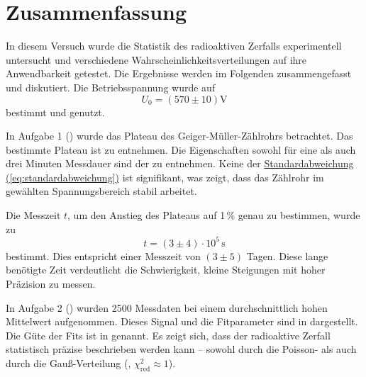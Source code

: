 



\section{Zusammenfassung}
\label{sec:Zusammenfassung}

In diesem Versuch wurde die Statistik des radioaktiven Zerfalls experimentell untersucht und verschiedene Wahrscheinlichkeitsverteilungen auf ihre Anwendbarkeit getestet. Die Ergebnisse werden im Folgenden zusammengefasst und diskutiert.
Die Betriebsspannung wurde auf
\[
    U_0 = (570 \pm 10) \mathrm{V}
\]
bestimmt und genutzt.

In Aufgabe 1 () wurde das Plateau des Geiger-Müller-Zählrohrs betrachtet. Das bestimmte Plateau ist  zu entnehmen. Die Eigenschaften sowohl für eine als auch drei Minuten Messdauer sind der  zu entnehmen. Keine der \hyperref[eq:standardabweichung]{Standardabweichung (\ref*{eq:standardabweichung})} ist signifikant, was zeigt, dass das Zählrohr im gewählten Spannungsbereich stabil arbeitet.

Die Messzeit $t$, um den Anstieg des Plateaus auf 1\,\% genau zu bestimmen, wurde zu 
\[
t = (3 \pm 4) \cdot 10^5\,\mathrm{s}
\]
bestimmt. Dies entspricht einer Messzeit von $(3 \pm 5)$ Tagen. Diese lange benötigte Zeit verdeutlicht die Schwierigkeit, kleine Steigungen mit hoher Präzision zu messen.

In Aufgabe 2 () wurden 2500 Messdaten bei einem durchschnittlich hohen Mittelwert aufgenommen. Dieses Signal und die Fitparameter sind in  dargestellt. Die Güte der Fits ist in  genannt. Es zeigt sich, dass der radioaktive Zerfall statistisch präzise beschrieben werden kann – sowohl durch die Poisson- als auch durch die Gauß-Verteilung (, $\chi^2_{\mathrm{red}} \approx 1$).

